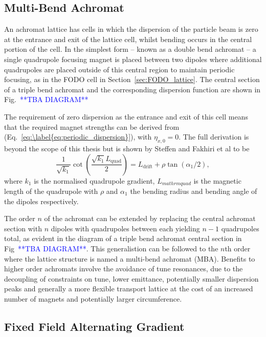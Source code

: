 \documentclass[../main.tex]{subfiles}
\begin{document}
\subsection{Multi-Bend Achromat}

An achromat lattice has cells in which the dispersion of the particle beam is zero at the entrance and exit of the lattice cell, whilst bending occurs in the central portion of the cell. In the simplest form -- known as a double bend achromat -- a single quadrupole focusing magnet is placed between two dipoles where additional quadrupoles are placed outside of this central region to maintain periodic focusing, as in the FODO cell in Section~\ref{sec:FODO_lattice}. The central section of a triple bend achromat and the corresponding dispersion function are shown in Fig.~\textcolor{blue}{**TBA DIAGRAM**}

The requirement of zero dispersion as the entrance and exit of this cell means that the required magnet strengths can be derived from (Eq.~\ref{eq:\label{eq:periodic_dispersion}}), with $\eta_{x,0}=0$.
The full derivation is beyond the scope of this thesis but is shown by Steffen \cite{steffen1983periodic} and Fakhiri et al \cite{fakhri2015analytical} to be
\begin{equation}
\frac{1}{\sqrt{k_{1}}}\cot\left(\frac{\sqrt{k_{1}}L_{\mathrm{quad}}}{2}\right) = L_{\mathrm{drift}} + \rho\tan\left(\alpha_{1}/2\right),
\label{eq:DBA_magnets}
\end{equation}
where $k_{1}$ is the normalised quadrupole gradient, $L_{mathrm{quad}}$ is the magnetic length of the quadrupole with $\rho$ and $\alpha_{1}$ the bending radius and bending angle of the dipoles respectively. 

The order $n$ of the achromat can be extended by replacing the central achromat section with $n$ dipoles with quadrupoles between each yielding $n-1$ quadrupoles total, as evident in the diagram of a triple bend achromat central section in Fig~\textcolor{blue}{**TBA DIAGRAM**}. This generalistion can be followed to the $n$th order where the lattice structure is named a multi-bend achromat (MBA). Benefits to higher order achromats involve the avoidance of tune resonances, due to the decoupling of constraints on tune, lower emittance, potentially smaller dispersion peaks and generally a more flexible transport lattice \cite{jackson1986comparison} at the cost of an increased number of magnets and potentially larger circumference.  

\subsection{Fixed Field Alternating Gradient}
\label{sec:FFA}
\end{document}
